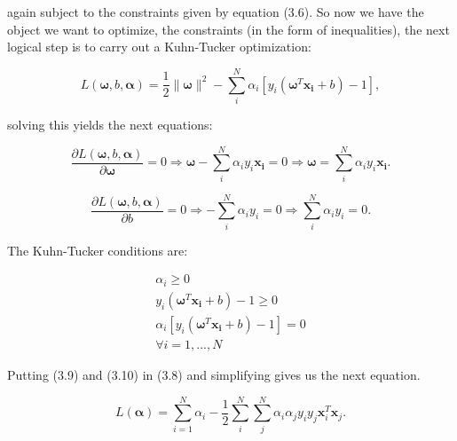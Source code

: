 \documentclass[a4paper,12pt]{article}
\numberwithin{equation}{section}
\begin{document}
\noindent
again subject to the constraints given by equation (3.6). So now we have the object we want to optimize, the constraints (in the form of inequalities), the next logical step is to carry out a Kuhn-Tucker optimization:

\begin{equation}\label{eq:8}
  L(\boldsymbol{\omega},b,\boldsymbol{\alpha})= \frac{1}{2}\|\boldsymbol{\omega}\|^2 - \sum_{i}^{N}\alpha_i[y_i(\boldsymbol{\omega}^T\boldsymbol{x_i}+b)-1],
\end{equation}

\noindent
solving this yields the next equations:

\begin{equation}\label{eq:9}
 \frac{\partial L(\boldsymbol{\omega},b,\boldsymbol{\alpha})}{\partial\boldsymbol{\omega} } = 0 \Longrightarrow \boldsymbol{\omega} - \sum_{i}^{N}\alpha_iy_i\boldsymbol{x_i} = 0 \Longrightarrow \boldsymbol{\omega} =  \sum_{i}^{N}\alpha_iy_i\boldsymbol{x_i}.
\end{equation}

\begin{equation}\label{eq:10}
\frac{\partial L(\boldsymbol{\omega},b,\boldsymbol{\alpha})}{\partial b}  = 0 \Longrightarrow - \sum_{i}^{N}\alpha_iy_i = 0 \Longrightarrow \sum_{i}^{N}\alpha_iy_i = 0.
\end{equation}

The Kuhn-Tucker conditions are:


\begin{align*}
  \alpha_i \geq 0 \\
  y_i(\boldsymbol{\omega}^T\boldsymbol{x_i}+b)-1 \geq 0 \\
  \alpha_i[y_i(\boldsymbol{\omega}^T\boldsymbol{x_i}+b)-1] = 0\\
  \forall i = 1, ..., N
\end{align*}

Putting (3.9) and (3.10) in (3.8) and simplifying gives us the next equation.

\begin{equation}\label{eq:11}
 L(\boldsymbol{\alpha}) = \sum_{i=1}^{N}\alpha_i-\frac{1}{2}\sum_{i}^{N}\sum_{j}^{N}\alpha_i\alpha_jy_iy_j\boldsymbol{x}_i^T\boldsymbol{x}_j.
\end{equation}
\end{document}
